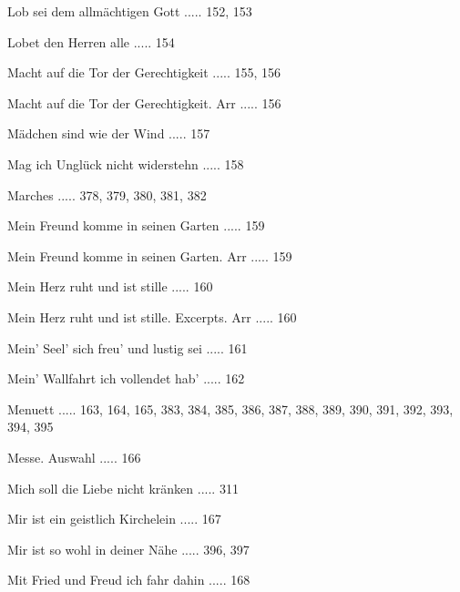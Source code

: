 \documentclass[twocolumn]{book}
\begin{document}
\newline 
Lob sei dem allmächtigen Gott ..... 152, 153

\newline 
Lobet den Herren alle ..... 154

\newline 
Macht auf die Tor der Gerechtigkeit ..... 155, 156

\newline 
Macht auf die Tor der Gerechtigkeit. Arr ..... 156

\newline 
Mädchen sind wie der Wind ..... 157

\newline 
Mag ich Unglück nicht widerstehn ..... 158

\newline 
Marches ..... 378, 379, 380, 381, 382

\newline 
Mein Freund komme in seinen Garten ..... 159

\newline 
Mein Freund komme in seinen Garten. Arr ..... 159

\newline 
Mein Herz ruht und ist stille ..... 160

\newline 
Mein Herz ruht und ist stille. Excerpts. Arr ..... 160

\newline 
Mein' Seel' sich freu' und lustig sei ..... 161

\newline 
Mein' Wallfahrt ich vollendet hab' ..... 162

\newline 
Menuett ..... 163, 164, 165, 383, 384, 385, 386, 387, 388, 389, 390, 391, 392, 393, 394, 395

\newline 
Messe. Auswahl ..... 166

\newline 
Mich soll die Liebe nicht kränken ..... 311

\newline 
Mir ist ein geistlich Kirchelein ..... 167

\newline 
Mir ist so wohl in deiner Nähe ..... 396, 397

\newline 
Mit Fried und Freud ich fahr dahin ..... 168
\end{document}

